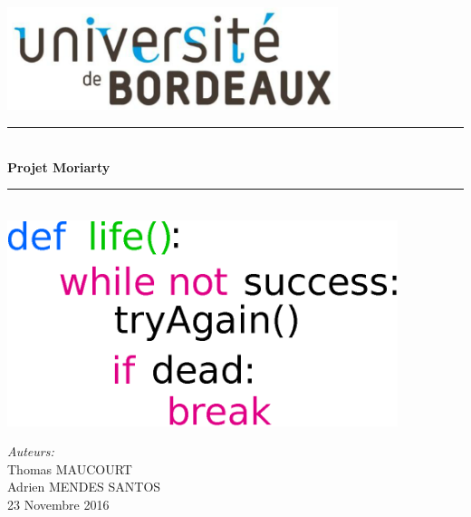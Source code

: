 \begin{titlepage}

\newcommand{\HRule}{\rule{\linewidth}{0.5mm}} %

\center %
 
\centering\includegraphics[height=3cm]{logofac.png}\\[1.5cm]



\HRule \\[0.6cm]
{ \huge \bfseries Projet Moriarty}\\[0.4cm] %
\HRule \\[0.6cm]

\vfill
\centering\includegraphics[height=6cm]{joke.eps}\\[0.5cm]
\vfill



\Large \emph{Auteurs:}\\
Thomas \textsc{MAUCOURT}\\[0.1cm] %
Adrien \textsc{MENDES SANTOS}\\[1cm] %


{\large 23 Novembre 2016}\\[2cm] %


\end{titlepage}

